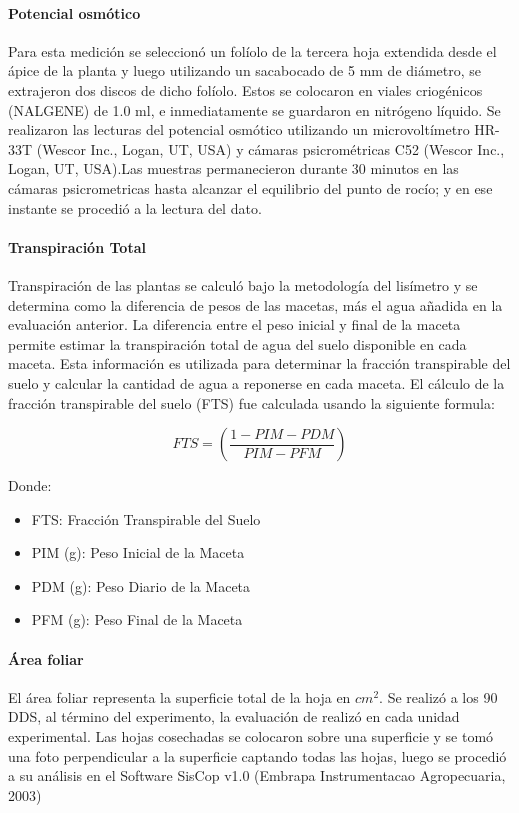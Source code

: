 \documentclass[fleqn,10pt]{Flavio}\usepackage[]{graphicx}\usepackage[]{color}
\begin{document}
\paragraph{Potencial osm\'otico} Para esta medici\'on se seleccion\'o un fol\'iolo de la tercera hoja extendida desde el \'apice de la planta y luego utilizando un sacabocado de 5 mm de di\'ametro, se extrajeron dos discos de dicho fol\'iolo. Estos se colocaron en viales criog\'enicos (NALGENE) de 1.0 ml, e inmediatamente se guardaron en nitr\'ogeno l\'iquido. Se realizaron las lecturas del potencial osm\'otico utilizando un microvolt\'imetro HR-33T  (Wescor Inc., Logan, UT, USA) y c\'amaras psicrom\'etricas C52 (Wescor Inc., Logan, UT, USA).Las muestras permanecieron durante 30 minutos  en las c\'amaras psicrometricas hasta alcanzar el equilibrio del punto de roc\'io; y en ese instante se procedi\'o a la lectura del dato.

\paragraph{Transpiraci\'on Total} Transpiraci\'on de las plantas se calcul\'o bajo la metodolog\'ia del lis\'imetro y se determina como la diferencia de pesos de las macetas, m\'as el agua a\~nadida en la evaluaci\'on anterior. La diferencia entre el peso inicial y final de la maceta permite estimar la transpiraci\'on total de agua del suelo disponible en cada maceta. Esta informaci\'on es utilizada para determinar la fracci\'on transpirable del suelo y calcular la cantidad de agua a reponerse en cada maceta. El c\'alculo de la fracci\'on transpirable del suelo (FTS) fue calculada usando la siguiente formula:

$$ FTS = \left(\frac{1 - PIM - PDM}{PIM - PFM}\right) $$

Donde:

\begin{itemize}[noitemsep]
  \item FTS: Fracci\'on Transpirable del Suelo 
  \item PIM (g): Peso Inicial de la Maceta 
  \item PDM (g): Peso Diario de la Maceta 
  \item PFM (g): Peso Final de la Maceta 
\end{itemize}


\paragraph{\'Area foliar} El \'area foliar representa la superficie total de la hoja en $cm^2$. Se realiz\'o a los 90 DDS, al t\'ermino del experimento, la evaluaci\'on de realiz\'o en cada unidad experimental. Las hojas cosechadas se colocaron sobre una superficie y se tom\'o una foto perpendicular a la superficie captando todas las hojas, luego se procedi\'o a su an\'alisis en el Software SisCop v1.0 (Embrapa Instrumentacao Agropecuaria, 2003)
\end{document}
